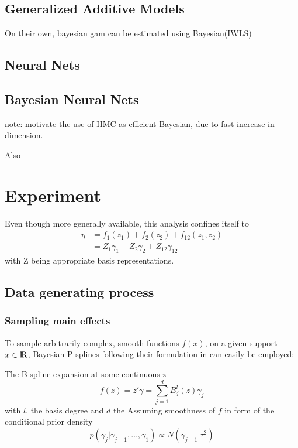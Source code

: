 \documentclass[11pt]{article}
\begin{document}
        \subsection{Generalized Additive Models}
        On their own, bayesian gam can be estimated using Bayesian(IWLS) \cite{}
        \subsection{Neural Nets}
        \subsection{Bayesian Neural Nets}
        note: motivate the use of HMC as efficient Bayesian, due to fast increase in dimension.

        Also

    \clearpage
    \section{Experiment}
        Even though more generally available, this analysis confines itself to
        \begin{align}
            \eta &= f_1(z_1) + f_2(z_2) + f_{12}(z_1 , z_2) \\
                 &= Z_1 \gamma_1 + Z_2 \gamma_2 + Z_{12} \gamma_{12}
        \end{align}
        with Z being appropriate basis representations.
        \subsection{Data generating process}
            \subsubsection{Sampling main effects} \label{maineffect}
            To sample arbitrarily complex, smooth functions $f(x)$, on a given support $x \in {\rm I\!R}$, Bayesian P-splines following their formulation in \cite{fahrmeir2013regression} can easily be employed:

            The B-spline expansion at some continuous z
            \begin{equation} \label{Bspline}
                f(z) = z'\gamma = \sum_{j=1}^d B_j^l (z)\gamma_j
            \end{equation}
            with $l$, the basis degree and $d$ the
            Assuming smoothness of $f$ in form of the conditional prior density
            \begin{equation}
                p(\gamma_j|\gamma_{j-1}, \dots, \gamma_1) \propto N(\gamma_{j-1}|\tau^2)
            \end{equation}
\end{document}
